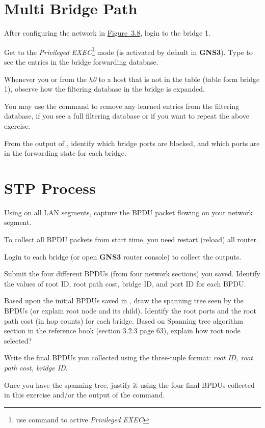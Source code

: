 \documentclass{../UTNetLab}
\begin{document}
\section{Multi Bridge Path}
After configuring the network in \hyperref[fig:3.8]{Figure~3.8}, login to the bridge 1.

Get to the \textit{Privileged EXEC}\footnote{use  command to active \textit{Privileged EXEC}} mode (is activated by default in \textbf{GNS3}).
Type  to see the entries in the bridge forwarding database.

Whenever you  or  from the \textit{h0} to a host that is not in the table (table form bridge 1), observe how the filtering database in the bridge is expanded.

You may use the  command to remove any learned entries from the filtering database, if you see a full filtering database or if you want to repeat the above exercise.

\begin{report}
    \item From the output of , identify which bridge ports are blocked, and which ports are in the forwarding state for each bridge.
\end{report}

\section{STP Process}
Using  on all LAN segments, capture the BPDU packet flowing on your network segment.

To collect all BPDU packets from start time, you need restart (reload) all router.

Login to each bridge (or open \textbf{GNS3} router console) to collect the  outputs.

\begin{report}
    \item Submit the four different BPDUs (from four network sections) you saved.
    Identify the values of root ID, root path cost, bridge ID, and port ID for each BPDU.

    \item Based upon the initial BPDUs saved in , draw the spanning tree seen by the BPDUs (or explain root node and its child).
    Identify the root ports and the root path cost (in hop counts) for each bridge.
    Based on Spanning tree algorithm section in the reference book (section 3.2.3 page 63), explain how root node selected?

    \item Write the final BPDUs you collected using the three-tuple format: \textit{{root ID, root path cost, bridge ID}}.

    \item Once you have the spanning tree, justify it using the four final BPDUs collected in this exercise and/or the output of the  command.
\end{report}
\end{document}
